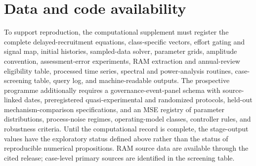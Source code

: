 \documentclass[11pt]{article}
\begin{document}
\section*{Data and code availability}
To support reproduction, the computational supplement must register the complete delayed-recruitment equations, class-specific vectors, effort gating and signal map, initial histories, sampled-data solver, parameter grids, amplitude convention, assessment-error experiments, RAM extraction and annual-review eligibility table, processed time series, spectral and power-analysis routines, case-screening table, query log, and machine-readable outputs. The prospective programme additionally requires a governance-event-panel schema with source-linked dates, preregistered quasi-experimental and randomized protocols, held-out mechanism-comparison specifications, and an MSE registry of parameter distributions, process-noise regimes, operating-model classes, controller rules, and robustness criteria. Until the computational record is complete, the stage-output values have the exploratory status defined above rather than the status of reproducible numerical propositions. RAM source data are available through the cited release; case-level primary sources are identified in the screening table.


\end{document}
